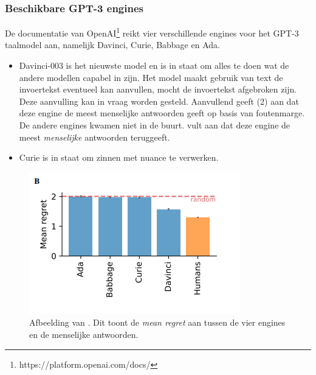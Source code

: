 \subsubsection{Beschikbare GPT-3 engines}

De documentatie van OpenAI\footnote{https://platform.openai.com/docs/} reikt vier verschillende engines voor het GPT-3 taalmodel aan, namelijk Davinci, Curie, Babbage en Ada. 



\begin{itemize}
	\item Davinci-003 is het nieuwste model en is in staat om alles te doen wat de andere modellen capabel in zijn. Het model maakt gebruik van text de invoertekst eventueel kan aanvullen, mocht de invoertekst afgebroken zijn. Deze aanvulling kan in vraag worden gesteld. Aanvullend geeft (2) aan dat deze engine de meest menselijke antwoorden geeft op basis van foutenmarge. De andere engines kwamen niet in de buurt. \textcite{Binz2023} vult aan dat deze engine de meest \textit{menselijke} antwoorden teruggeeft.
	\item Curie is in staat om zinnen met nuance te verwerken.
\end{itemize} 

\begin{figure}
	\begin{center}
		\includegraphics{img/chatgpt-engines-mean-regret.png}
		\caption{Afbeelding van \textcite{Binz2023}. Dit toont de \textit{mean regret} aan tussen de vier engines en de menselijke antwoorden.}
	\end{center}
\end{figure}

